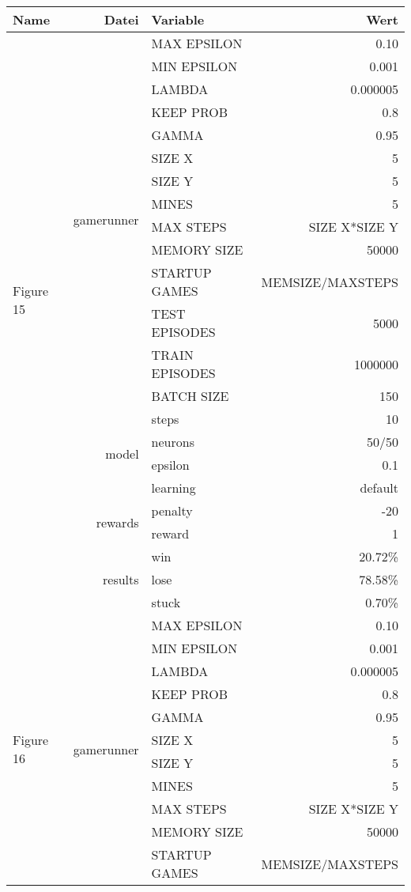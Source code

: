 \documentclass[9pt]{article}
\begin{document}
\begin{tabularx}{\textwidth}{l|r|X|r}
	Name & Datei & Variable & Wert \\
	\hline
	\multirow{21}{*}{Figure 15} & \multirow{14}{*}{gamerunner} & MAX EPSILON	& 0.10\\
	& & MIN EPSILON	& 0.001 \\
	& & LAMBDA & 0.000005 \\
	& & KEEP PROB & 0.8 \\
	& & GAMMA	& 0.95 \\
	& & SIZE X & 5 \\
	& & SIZE Y & 5 \\
	& & MINES & 5 \\
	& & MAX STEPS & SIZE X*SIZE Y\\
	& & MEMORY SIZE & 50000 \\
	& & STARTUP GAMES & MEMSIZE/MAXSTEPS \\
	& & TEST EPISODES & 5000 \\
	& & TRAIN EPISODES & 1000000 \\
	& & BATCH SIZE & 150 \\
	& & steps & 10\\\cline{2-4}
	& \multirow{2}{*}{model} & neurons & 50/50 \\ 
	& & epsilon & 0.1\\
	& & learning & default \\\cline{2-4}
	& \multirow{2}{*}{rewards} & penalty & -20\\
	& & reward & 1\\\cline{2-4}
	& \multirow{3}{*}{results} & win & 20.72\%\\
	& & lose & 78.58\%\\
	& & stuck & 0.70\%\\
	\hline
	\hline
	\multirow{21}{*}{Figure 16} & \multirow{14}{*}{gamerunner} & MAX EPSILON	& 0.10\\
	& & MIN EPSILON	& 0.001 \\
	& & LAMBDA & 0.000005 \\
	& & KEEP PROB & 0.8 \\
	& & GAMMA	& 0.95 \\
	& & SIZE X & 5 \\
	& & SIZE Y & 5 \\
	& & MINES & 5 \\
	& & MAX STEPS & SIZE X*SIZE Y\\
	& & MEMORY SIZE & 50000 \\
	& & STARTUP GAMES & MEMSIZE/MAXSTEPS \\

\end{tabularx}
\end{document}
